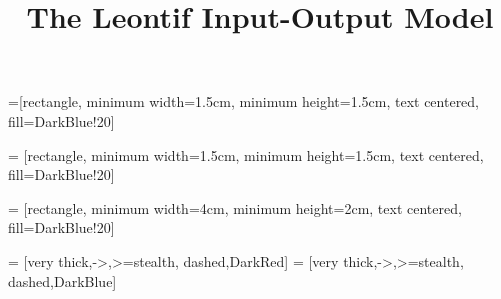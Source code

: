 \title{The Leontif Input-Output Model}
\subtitle{\SubTitleName}
\institute[]{\Course}
\author{\Instructor}
\maketitle  





 =[rectangle, minimum width=1.5cm, minimum height=1.5cm, text centered, fill=DarkBlue!20]

 = [rectangle, minimum width=1.5cm, minimum height=1.5cm, text centered, fill=DarkBlue!20]

 = [rectangle, minimum width=4cm, minimum height=2cm, text centered, fill=DarkBlue!20]

 = [very thick,->,>=stealth, dashed,DarkRed]
 = [very thick,->,>=stealth, dashed,DarkBlue]






